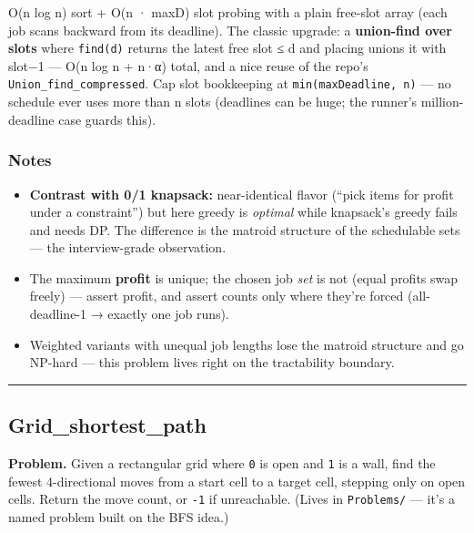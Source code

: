 \documentclass[
  10pt,
  letterpaper,
  onecolumn]{article}
\providecommand{\tightlist}{%
  \setlength{\itemsep}{0pt}\setlength{\parskip}{0pt}}
\begin{document}
O(n log n) sort + O(n · maxD) slot probing with a plain free-slot array
(each job scans backward from its deadline). The classic upgrade: a
\textbf{union-find over slots} where \texttt{find(d)} returns the latest
free slot ≤ d and placing unions it with slot−1 --- O(n log n + n·α)
total, and a nice reuse of the repo's \texttt{Union\_find\_compressed}.
Cap slot bookkeeping at \texttt{min(maxDeadline,\ n)} --- no schedule
ever uses more than n slots (deadlines can be huge; the runner's
million-deadline case guards this).

\hypertarget{notes-14}{%
\subsubsection{Notes}\label{notes-14}}

\begin{itemize}
\tightlist
\item
  \textbf{Contrast with 0/1 knapsack:} near-identical flavor (``pick
  items for profit under a constraint'') but here greedy is
  \emph{optimal} while knapsack's greedy fails and needs DP. The
  difference is the matroid structure of the schedulable sets --- the
  interview-grade observation.
\item
  The maximum \textbf{profit} is unique; the chosen job \emph{set} is
  not (equal profits swap freely) --- assert profit, and assert counts
  only where they're forced (all-deadline-1 → exactly one job runs).
\item
  Weighted variants with unequal job lengths lose the matroid structure
  and go NP-hard --- this problem lives right on the tractability
  boundary.
\end{itemize}

\begin{center}\rule{0.5\linewidth}{0.5pt}\end{center}

\hypertarget{grid_shortest_path}{%
\subsection{Grid\_shortest\_path}\label{grid_shortest_path}}

\textbf{Problem.} Given a rectangular grid where \texttt{0} is open and
\texttt{1} is a wall, find the fewest 4-directional moves from a start
cell to a target cell, stepping only on open cells. Return the move
count, or \texttt{-1} if unreachable. (Lives in \texttt{Problems/} ---
it's a named problem built on the BFS idea.)
\end{document}
